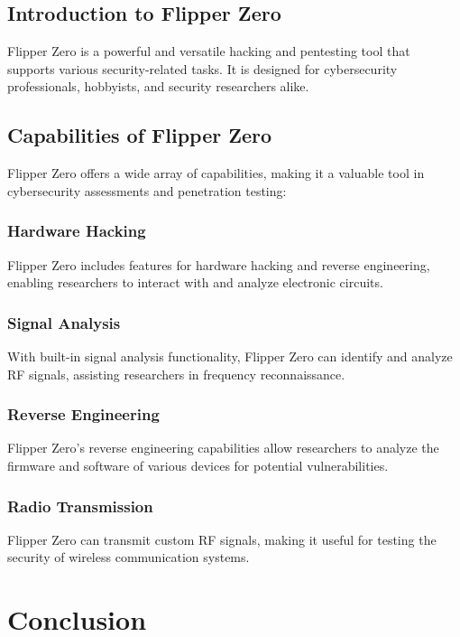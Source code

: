 \documentclass{article}
\begin{document}
\subsection{Introduction to Flipper Zero}

Flipper Zero is a powerful and versatile hacking and pentesting tool that supports various security-related tasks. It is designed for cybersecurity professionals, hobbyists, and security researchers alike.

\subsection{Capabilities of Flipper Zero}

Flipper Zero offers a wide array of capabilities, making it a valuable tool in cybersecurity assessments and penetration testing:

\subsubsection{Hardware Hacking}

Flipper Zero includes features for hardware hacking and reverse engineering, enabling researchers to interact with and analyze electronic circuits.

\subsubsection{Signal Analysis}

With built-in signal analysis functionality, Flipper Zero can identify and analyze RF signals, assisting researchers in frequency reconnaissance.

\subsubsection{Reverse Engineering}

Flipper Zero's reverse engineering capabilities allow researchers to analyze the firmware and software of various devices for potential vulnerabilities.

\subsubsection{Radio Transmission}

Flipper Zero can transmit custom RF signals, making it useful for testing the security of wireless communication systems.

\section{Conclusion}
\end{document}
